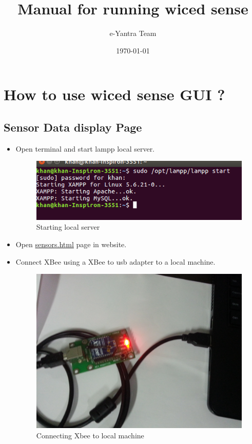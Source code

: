 \documentclass[11pt,a4paper]{article}
\begin{document}
\begin{titlepage}
\title{Manual for running wiced sense}
\author{e-Yantra Team}
\date{\today}
\maketitle
\end{titlepage}
\listoffigures
\tableofcontents
    \newpage
	\section{How to use wiced sense GUI ?}
	\subsection{Sensor Data display Page}
	
	 \begin{itemize}
	 \item Open terminal and start lampp local server.
	 
	 	\begin{figure}[h]
    \centering
	\includegraphics[scale=0.5]{lampstart.png}
	\caption{Starting local server}
	\end{figure}
	 
	 \item Open \href{https://github.com/eYSIP-2016/Wiced-Sense/blob/master/Codes/wiced_web/sensors.html}{sensors.html} page in website.
	 \item Connect XBee using a XBee to usb adapter to a local machine.
	 
	 \begin{figure}[h]
        \centering
	    \includegraphics[scale=0.1]{20160722_194935.jpg}
	    \caption{Connecting Xbee to local machine}
	\end{figure}
	 

\end{itemize}
\end{document}

